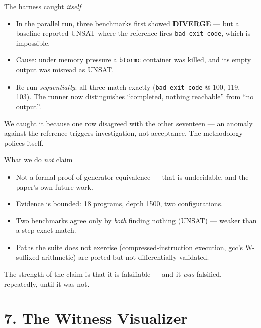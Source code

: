 \documentclass[aspectratio=169]{beamer}
\newcommand{\lab}[1]{{\footnotesize\color{ink!65}#1}}
\newcommand{\key}[1]{\textbf{\color{accentdk}#1}}
\begin{document}
\begin{frame}{The harness caught \emph{itself}}
  \begin{itemize}\setlength\itemsep{0.3em}\footnotesize
    \item In the parallel run, three benchmarks first showed
          \key{DIVERGE} --- but a baseline reported UNSAT where the reference
          fires \texttt{bad-exit-code}, which is impossible.
    \item Cause: under memory pressure a \texttt{btormc} container was killed,
          and its empty output was misread as UNSAT.
    \item Re-run \emph{sequentially}: all three match exactly
          (\texttt{bad-exit-code} @ 100, 119, 103). The runner now
          distinguishes ``completed, nothing reachable'' from ``no output''.
  \end{itemize}
  \vfill
  \lab{We caught it because one row disagreed with the other seventeen ---
       an anomaly against the reference triggers investigation, not
       acceptance. The methodology polices itself.}
\end{frame}

\begin{frame}{What we do \emph{not} claim}
  \begin{itemize}\setlength\itemsep{0.35em}\footnotesize
    \item Not a formal proof of generator equivalence --- that is undecidable,
          and the paper's own future work.
    \item Evidence is bounded: 18 programs, depth 1500, two configurations.
    \item Two benchmarks agree only by \emph{both} finding nothing (UNSAT) ---
          weaker than a step-exact match.
    \item Paths the suite does not exercise (compressed-instruction execution,
          gcc's W-suffixed arithmetic) are ported but not differentially
          validated.
  \end{itemize}
  \vfill
  \lab{The strength of the claim is that it is falsifiable --- and it
       \emph{was} falsified, repeatedly, until it was not.}
\end{frame}

\section{7. The Witness Visualizer}
\end{document}
